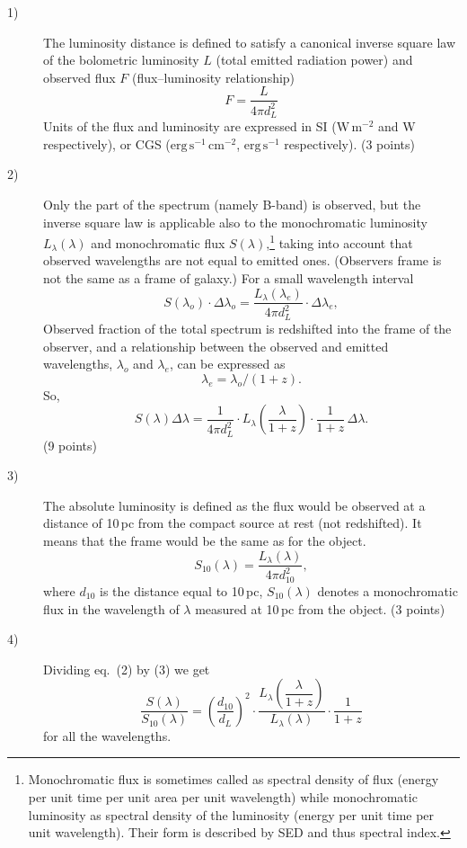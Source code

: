 \begin{description}
\item[1)] The luminosity distance is defined to satisfy a canonical inverse
  square law of the bolometric luminosity $L$ (total emitted radiation power)
  and observed flux $F$ (flux--luminosity relationship)
  \[ F = \frac{L}{4\pi d_L^2} \tag*{(1)} \]
  Units of the flux and luminosity are expressed in SI
  ($\mathrm{W\,m^{-2}}$ and W respectively), or CGS
  ($\mathrm{erg\,s^{-1}\,cm^{-2}}$, $\mathrm{erg\,s^{-1}}$ respectively).
  \hfill(3 points)

\item[2)] Only the part of the spectrum (namely B-band) is observed, but the
  inverse square law is applicable also to the monochromatic luminosity
  $L_\lambda(\lambda)$ and monochromatic flux
  $S(\lambda)$,\footnote{Monochromatic flux is sometimes called as spectral
  density of flux (energy per unit time per unit area per unit wavelength)
  while monochromatic luminosity as spectral density of the luminosity (energy
  per unit time per unit wavelength). Their form is described by SED and thus
  spectral index.} taking into account that observed wavelengths are not equal
  to emitted ones. (Observers frame is not the same as a frame of galaxy.) For
  a small wavelength interval
  \[ S(\lambda_o)\cdot\Delta\lambda_o
     = \frac{L_\lambda(\lambda_e)}{4\pi d_L^2}\cdot\Delta\lambda_e , \]
  Observed fraction of the total spectrum is redshifted into the frame of the
  observer, and a relationship between the observed and emitted wavelengths,
  $\lambda_o$ and $\lambda_e$, can be expressed as
  \[ \lambda_e = \lambda_o/(1+z) . \]
  So,
  \[ S(\lambda)\Delta\lambda = \frac{1}{4\pi d_L^2}\cdot
     L_\lambda\!\left(\frac{\lambda}{1+z}\right)\cdot\frac{1}{1+z}\,
     \Delta\lambda . \tag*{(2)} \]
  \hfill(9 points)

\item[3)] The absolute luminosity is defined as the flux would be observed at
  a distance of 10\,pc from the compact source at rest (not redshifted). It
  means that the frame would be the same as for the object.
  \[ S_{10}(\lambda) = \frac{L_\lambda(\lambda)}{4\pi d_{10}^2}, \tag*{(3)} \]
  where $d_{10}$ is the distance equal to 10\,pc, $S_{10}(\lambda)$ denotes a
  monochromatic flux in the wavelength of $\lambda$ measured at 10\,pc from
  the object.
  \hfill(3 points)

\item[4)] Dividing eq.~(2) by (3) we get
  \[ \frac{S(\lambda)}{S_{10}(\lambda)}
     = \left(\frac{d_{10}}{d_L}\right)^2 \cdot
       \frac{L_\lambda\!\left(\dfrac{\lambda}{1+z}\right)}{L_\lambda(\lambda)}
       \cdot \frac{1}{1+z} \tag*{(4)} \]
  for all the wavelengths.


\end{description}
